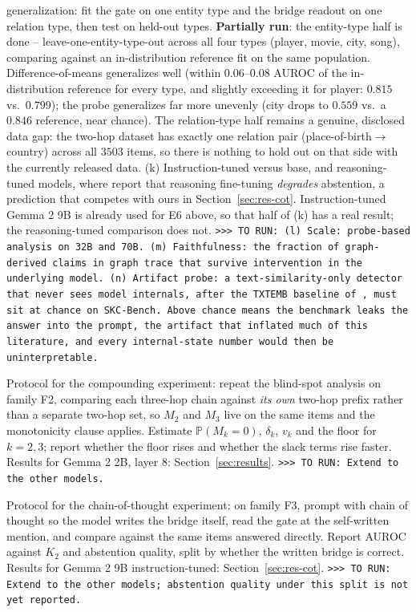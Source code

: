 \documentclass{article}
\newcommand{\TORUN}[1]{{\color{blue}\texttt{>{}>{}> TO RUN: #1}}}
\begin{document}
generalization: fit the
gate on one entity type and the bridge readout on one relation type, then test on held-out types.
\textbf{Partially run}: the entity-type half is done -- leave-one-entity-type-out across all four
types (player, movie, city, song), comparing against an in-distribution reference fit on the same
population. Difference-of-means generalizes well (within $0.06$--$0.08$ AUROC of the in-distribution
reference for every type, and slightly exceeding it for player: $0.815$ vs.\ $0.799$); the probe
generalizes far more unevenly (city drops to $0.559$ vs.\ a $0.846$ reference, near chance). The
relation-type half remains a genuine, disclosed data gap: the two-hop dataset has exactly one relation
pair (place-of-birth$\to$country) across all $3503$ items, so there is nothing to hold out on that
side with the currently released data.
(k) Instruction-tuned versus base, and reasoning-tuned models, where
\citet{kirichenko2025abstentionbench} report that reasoning fine-tuning \emph{degrades} abstention, a
prediction that competes with ours in Section~\ref{sec:res-cot}. Instruction-tuned Gemma 2 9B is
already used for E6 above, so that half of (k) has a real result; the reasoning-tuned comparison does
not. \TORUN{(l) Scale: probe-based analysis on
32B and 70B. (m) Faithfulness: the fraction of graph-derived claims in graph trace that survive intervention in the
underlying model. (n) Artifact probe: a text-similarity-only detector that never sees model internals, after the
TXTEMB baseline of \citet{hussain2026parallax}, must sit at chance on SKC-Bench. Above chance means
the benchmark leaks the answer into the prompt, the artifact that inflated much of this literature,
and every internal-state number would then be uninterpretable.}



Protocol for the compounding experiment: repeat the blind-spot analysis on family F2, comparing each
three-hop chain against \emph{its own} two-hop
prefix rather than a separate two-hop set, so $M_2$ and $M_3$ live on the same items and the
monotonicity clause applies. Estimate $\mathbb{P}(M_k=0)$, $\delta_k$, $v_k$ and the floor for
$k=2,3$; report whether the floor rises and whether the slack terms rise faster. Results for Gemma 2
2B, layer 8: Section~\ref{sec:results}. \TORUN{Extend to the other models.}

Protocol for the chain-of-thought experiment: on family F3, prompt with chain of thought so the model
writes the bridge itself, read the
gate at the self-written mention, and compare against the same items answered directly. Report AUROC
against $K_2$ and abstention quality, split by whether the written bridge is correct. Results for
Gemma 2 9B instruction-tuned: Section~\ref{sec:res-cot}. \TORUN{Extend to the other models; abstention
quality under this split is not yet reported.}
\end{document}
